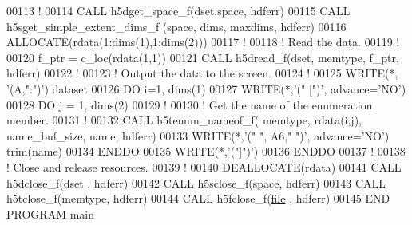 \begin{DoxyCode}
00113   \textcolor{comment}{!}
00114   \textcolor{keyword}{CALL }h5dget\_space\_f(dset,space, hdferr)
00115   \textcolor{keyword}{CALL }h5sget\_simple\_extent\_dims\_f (space, dims, maxdims, hdferr)
00116   \textcolor{keyword}{ALLOCATE}(rdata(1:dims(1),1:dims(2)))
00117   \textcolor{comment}{!}
00118   \textcolor{comment}{! Read the data.}
00119   \textcolor{comment}{!}
00120   f\_ptr = c\_loc(rdata(1,1))
00121   \textcolor{keyword}{CALL }h5dread\_f(dset, memtype, f\_ptr, hdferr)
00122   \textcolor{comment}{!}
00123   \textcolor{comment}{! Output the data to the screen.}
00124   \textcolor{comment}{!}
00125   \textcolor{keyword}{WRITE}(*, \textcolor{stringliteral}{'(A,":")'}) dataset
00126   \textcolor{keywordflow}{DO} i=1, dims(1)
00127      \textcolor{keyword}{WRITE}(*,\textcolor{stringliteral}{'(" [")'}, advance=\textcolor{stringliteral}{'NO'})
00128      \textcolor{keywordflow}{DO} j = 1, dims(2)
00129         \textcolor{comment}{!}
00130         \textcolor{comment}{! Get the name of the enumeration member.}
00131         \textcolor{comment}{!}
00132         \textcolor{keyword}{CALL }h5tenum\_nameof\_f( memtype, rdata(i,j), name\_buf\_size, name, hdferr) 
00133         \textcolor{keyword}{WRITE}(*,\textcolor{stringliteral}{'(" ", A6," ")'}, advance=\textcolor{stringliteral}{'NO'}) trim(name)
00134 \textcolor{keywordflow}{     ENDDO}
00135      \textcolor{keyword}{WRITE}(*,\textcolor{stringliteral}{'("]")'})
00136 \textcolor{keywordflow}{  ENDDO}
00137   \textcolor{comment}{!}
00138   \textcolor{comment}{! Close and release resources.}
00139   \textcolor{comment}{!}
00140   \textcolor{keyword}{DEALLOCATE}(rdata)
00141   \textcolor{keyword}{CALL }h5dclose\_f(dset , hdferr)
00142   \textcolor{keyword}{CALL }h5sclose\_f(space, hdferr)
00143   \textcolor{keyword}{CALL }h5tclose\_f(memtype, hdferr)
00144   \textcolor{keyword}{CALL }h5fclose\_f(\hyperlink{structfile}{file} , hdferr)
00145 \textcolor{keyword}{END PROGRAM }main
\end{DoxyCode}
